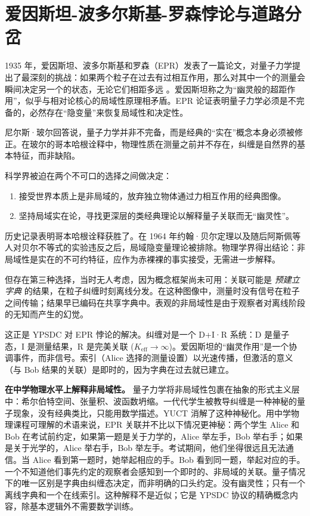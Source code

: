 \documentclass[12pt,a4paper]{article}
\begin{document}
	\section{爱因斯坦-波多尔斯基-罗森悖论与道路分岔}
	
	1935 年，爱因斯坦、波多尔斯基和罗森（EPR）发表了一篇论文，对量子力学提出了最深刻的挑战：如果两个粒子在过去有过相互作用，那么对其中一个的测量会瞬间决定另一个的状态，无论它们相距多远 \cite{EPR1935}。爱因斯坦称之为“幽灵般的超距作用”，似乎与相对论核心的局域性原理相矛盾。EPR 论证表明量子力学必须是不完备的，必然存在“隐变量”来恢复局域性和决定性。
	
	尼尔斯·玻尔回答说，量子力学并非不完备，而是经典的“实在”概念本身必须被修正。在玻尔的哥本哈根诠释中，物理性质在测量之前并不存在，纠缠是自然界的基本特征，而非缺陷。
	
	科学界被迫在两个不可口的选择之间做决定：
	\begin{enumerate}
		\item 接受世界本质上是非局域的，放弃独立物体通过力相互作用的经典图像。
		\item 坚持局域实在论，寻找更深层的类经典理论以解释量子关联而无“幽灵性”。
	\end{enumerate}
	
	历史记录表明哥本哈根诠释获胜了。在 1964 年约翰·贝尔定理以及随后阿斯佩等人对贝尔不等式的实验违反之后，局域隐变量理论被排除。物理学界得出结论：非局域性是实在的不可约特征，应作为赤裸裸的事实接受，无需进一步解释。
	
	但存在第三种选择，当时无人考虑，因为概念框架尚未可用：关联可能是 \emph{预建立字典} 的结果，在粒子纠缠时刻离线分发。在这种图像中，测量时没有信号在粒子之间传输；结果早已编码在共享字典中。表观的非局域性是由于观察者对离线阶段的无知而产生的幻觉。
	
	这正是 YPSDC 对 EPR 悖论的解决。纠缠对是一个 D+I·R 系统：D 是量子态，I 是测量结果，R 是完美关联 (\(K_{\mathrm{eff}} \to \infty\))。爱因斯坦的“幽灵作用”是一个协调事件，而非信号。索引（Alice 选择的测量设置）以光速传播，但激活的意义（与 Bob 结果的关联）是即时的，因为字典在过去就已建立。
	
	\textbf{在中学物理水平上解释非局域性。} 量子力学将非局域性包裹在抽象的形式主义层中：希尔伯特空间、张量积、波函数坍缩。一代代学生被教导纠缠是一种神秘的量子现象，没有经典类比，只能用数学描述。YUCT 消解了这种神秘化。用中学物理课程可理解的术语来说，EPR 关联并不比以下情况更神秘：两个学生 Alice 和 Bob 在考试前约定，如果第一题是关于力学的，Alice 举左手，Bob 举右手；如果是关于光学的，Alice 举右手，Bob 举左手。考试期间，他们坐得很远且无法通信。当 Alice 看到第一题时，她举起相应的手。Bob 看到同一题，举起对应的手。一个不知道他们事先约定的观察者会感知到一个即时的、非局域的关联。量子情况下的唯一区别是字典由纠缠态决定，而非明确的口头约定。没有幽灵性；只有一个离线字典和一个在线索引。这种解释不是近似；它是 YPSDC 协议的精确概念内容，除基本逻辑外不需要数学训练。
	
\end{document}

